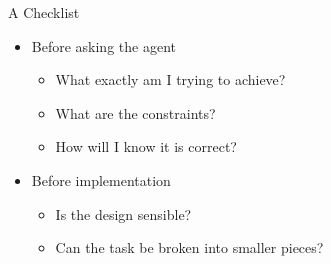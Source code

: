 \documentclass[
ps,
]{prosper}
\begin{document}
\begin{slide}{A Checklist}

\begin{itemize}

\item Before asking the agent

  \begin{itemize}
    
  \item What exactly am I trying to achieve?

  \item What are the constraints?

  \item How will I know it is correct?
    
  \end{itemize}

\item Before implementation

  \begin{itemize}
    
  \item Is the design sensible?

  \item Can the task be broken into smaller pieces?
    
  \end{itemize}
  
\end{itemize}
  
\end{slide}
\end{document}
